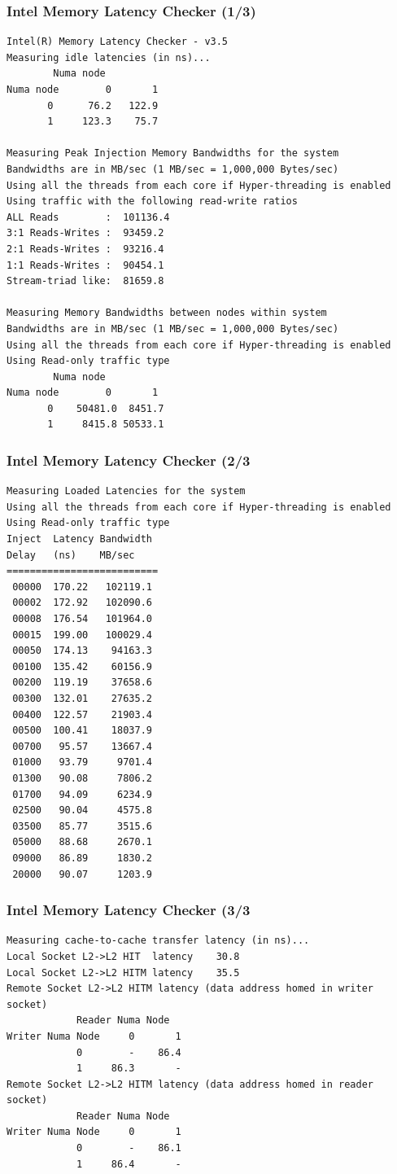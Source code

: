 \begin{frame}[containsverbatim]
\frametitle{Intel Memory Latency Checker (1/3)}
\tiny
\begin{verbatim}
Intel(R) Memory Latency Checker - v3.5
Measuring idle latencies (in ns)...
		Numa node
Numa node	     0	     1	
       0	  76.2	 122.9	
       1	 123.3	  75.7	

Measuring Peak Injection Memory Bandwidths for the system
Bandwidths are in MB/sec (1 MB/sec = 1,000,000 Bytes/sec)
Using all the threads from each core if Hyper-threading is enabled
Using traffic with the following read-write ratios
ALL Reads        :	101136.4	
3:1 Reads-Writes :	93459.2	
2:1 Reads-Writes :	93216.4	
1:1 Reads-Writes :	90454.1	
Stream-triad like:	81659.8	

Measuring Memory Bandwidths between nodes within system 
Bandwidths are in MB/sec (1 MB/sec = 1,000,000 Bytes/sec)
Using all the threads from each core if Hyper-threading is enabled
Using Read-only traffic type
		Numa node
Numa node	     0	     1	
       0	50481.0	 8451.7	
       1	 8415.8	50533.1	
\end{verbatim}
\end{frame}

\begin{frame}[containsverbatim]
\frametitle{Intel Memory Latency Checker (2/3}
\tiny
\begin{verbatim}
Measuring Loaded Latencies for the system
Using all the threads from each core if Hyper-threading is enabled
Using Read-only traffic type
Inject	Latency	Bandwidth
Delay	(ns)	MB/sec
==========================
 00000	170.22	 102119.1
 00002	172.92	 102090.6
 00008	176.54	 101964.0
 00015	199.00	 100029.4
 00050	174.13	  94163.3
 00100	135.42	  60156.9
 00200	119.19	  37658.6
 00300	132.01	  27635.2
 00400	122.57	  21903.4
 00500	100.41	  18037.9
 00700	 95.57	  13667.4
 01000	 93.79	   9701.4
 01300	 90.08	   7806.2
 01700	 94.09	   6234.9
 02500	 90.04	   4575.8
 03500	 85.77	   3515.6
 05000	 88.68	   2670.1
 09000	 86.89	   1830.2
 20000	 90.07	   1203.9
\end{verbatim}
\end{frame}


\begin{frame}[containsverbatim]
\frametitle{Intel Memory Latency Checker (3/3}
\tiny
\begin{verbatim}
Measuring cache-to-cache transfer latency (in ns)...
Local Socket L2->L2 HIT  latency	30.8
Local Socket L2->L2 HITM latency	35.5
Remote Socket L2->L2 HITM latency (data address homed in writer socket)
			Reader Numa Node
Writer Numa Node     0	     1	
            0	     -	  86.4	
            1	  86.3	     -	
Remote Socket L2->L2 HITM latency (data address homed in reader socket)
			Reader Numa Node
Writer Numa Node     0	     1	
            0	     -	  86.1	
            1	  86.4	     -	
\end{verbatim}
\end{frame}




